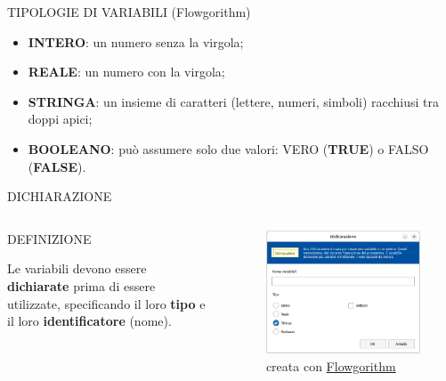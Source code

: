 \documentclass[aspectratio=1610, handout]{beamer}
\begin{document}
\begin{frame}{TIPOLOGIE DI VARIABILI (Flowgorithm)}
    \begin{itemize}
        \item \textbf{INTERO}: un numero senza la virgola;
        \pause
        \item \textbf{REALE}: un numero con la virgola;
        \pause
        \item \textbf{STRINGA}: un insieme di caratteri (lettere, numeri, simboli) racchiusi tra doppi apici;
        \pause
        \item \textbf{BOOLEANO}: può assumere solo due valori: VERO (\textbf{TRUE}) o FALSO (\textbf{FALSE}).
    \end{itemize}
\end{frame}

\begin{frame}{DICHIARAZIONE}
    \begin{columns}
            \begin{alertblock}{DEFINIZIONE}
                \begin{minipage}{0.96\linewidth}
                    \justifying
                    Le variabili devono essere \textbf{dichiarate} prima di essere utilizzate, 
                    specificando il loro \textbf{tipo} e il loro \textbf{identificatore} (nome).
                \end{minipage}
            \end{alertblock}
            \begin{figure}
                \includegraphics[width=\linewidth]{img/dichiarazione.png}
                \caption{{creata con \href{http://www.flowgorithm.org/}{Flowgorithm}}}
            \end{figure}
    \end{columns}
\end{frame}
\end{document}
